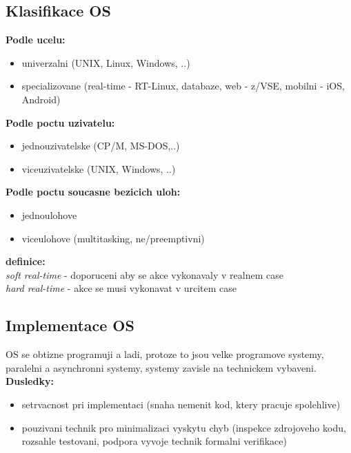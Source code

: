 \documentclass[a4paper, 11pt]{article}
\begin{document}
\newpage

\subsection{Klasifikace OS}

\noindent\textbf{Podle ucelu:}
\begin{itemize}
    \item univerzalni (UNIX, Linux, Windows, ..)
    \item specializovane (real-time - RT-Linux, databaze, web - z/VSE, mobilni - iOS, Android) \\
\end{itemize}

\noindent\textbf{Podle poctu uzivatelu:}
\begin{itemize}
    \item jednouzivatelske (CP/M, MS-DOS,..)
    \item viceuzivatelske (UNIX, Windows, ..) \\
\end{itemize}

\noindent\textbf{Podle poctu soucasne bezicich uloh:}
\begin{itemize}
    \item jednoulohove
    \item viceulohove (multitasking, ne/preemptivni) \\
\end{itemize}

\noindent\textbf{definice:} \\[0.5em]
\textit{soft real-time} - doporuceni aby se akce vykonavaly v realnem case \\[0.2em]
\textit{hard real-time} - akce se musi vykonavat v urcitem case \\[1em]

\subsection{Implementace OS}

OS se obtizne programuji a ladi, protoze to jsou velke programove systemy, paralelni a asynchronni systemy, systemy zavisle na technickem vybaveni. \\

\noindent\textbf{Dusledky:}
\begin{itemize}
    \item setrvacnost pri implementaci (snaha nemenit kod, ktery pracuje spolehlive)
    \item pouzivani technik pro minimalizaci vyskytu chyb (inspekce zdrojoveho kodu, rozsahle testovani, podpora vyvoje technik formalni verifikace) \\
\end{itemize}
\end{document}
